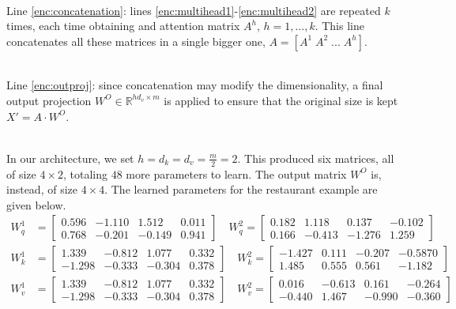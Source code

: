 \documentclass[algorithms,article,submit,pdftex,moreauthors]{Definitions/mdpi}
\begin{document}
~\\Line \ref{enc:concatenation}: lines \ref{enc:multihead1}-\ref{enc:multihead2} are repeated $k$ times, each time obtaining and attention matrix $A^h$, $h=1,\dots,k$. This line concatenates all these matrices in a single bigger one, $A = [A^1\;A^2\;...\;A^h]$.

~\\Line \ref{enc:outproj}: since concatenation may modify the dimensionality, a final output projection $W^O \in \mathbb{R}^{hd_v \times m}$ is applied to ensure that the original size is kept $X' = A \cdot W^O$.

~\\In our architecture, we set $h = d_k = d_v = \frac{m}{2} = 2$. This produced six matrices, all of size $4 \times 2$, totaling $48$ more parameters to learn. The output matrix $W^O$ is, instead, of size $4 \times 4$. The learned parameters for the restaurant example are given below.
\begin{align*}
    W^1_q &=    \begin{bmatrix}
                0.596 & -1.110 & 1.512 & 0.011 \\
                0.768 & -0.201 & -0.149 & 0.941
                \end{bmatrix}   \quad
    W^2_q =     \begin{bmatrix}
                0.182 & 1.118 & 0.137 & -0.102 \\
                0.166 & -0.413 & -1.276 & 1.259
                \end{bmatrix} \\
    W^1_k &=    \begin{bmatrix}
                     1.339 & -0.812 & 1.077 & 0.332 \\
                    -1.298 & -0.333 & -0.304 & 0.378
                \end{bmatrix} \quad
    W^2_k =     \begin{bmatrix}
                    -1.427 & 0.111 & -0.207 & -0.5870 \\
                    1.485 & 0.555 & 0.561 & -1.182 
                \end{bmatrix} \\
    W^1_v &=     \begin{bmatrix}
                    1.339 & -0.812 & 1.077 & 0.332 \\
                    -1.298 & -0.333 & -0.304 & 0.378
                \end{bmatrix} \quad
    W^2_v =     \begin{bmatrix}
                    0.016 & -0.613 & 0.161 & -0.264 \\
                    -0.440 & 1.467 & -0.990 & -0.360
                \end{bmatrix}
\end{align*}
\end{document}
